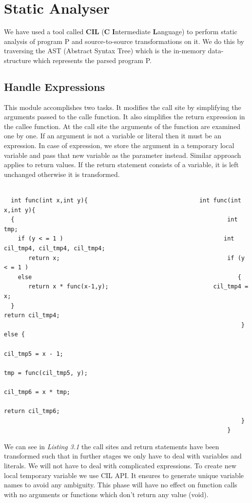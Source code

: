\documentclass[12pt,oneside]{book}
\begin{document}
\section{Static Analyser}
We have used a tool called \textbf{CIL}\cite{cilapi} (\textbf{C} \textbf{I}ntermediate \textbf{L}anguage) to perform static analysis of program P and source-to-source transformations on it. We do this by traversing the AST (Abstract Syntax Tree) which is the in-memory data-structure which represents the parsed program P.

\subsection{Handle Expressions}

This module accomplishes two tasks. It modifies the call site by simplifying the arguments passed to the calle function. It also simplifies the return expression in the callee function. At the call site the arguments of the function are examined one by one. If an argument is not a variable or literal then it must be an expression. In case of expression, we store the argument in a temporary local variable and pass that new variable as the parameter instead. Similar approach applies to return values. If the return statement consists of a variable, it is left unchanged otherwise it is transformed.\\

\begin{lstlisting}[caption=Expressions simplified]

  int func(int x,int y){								int func(int x,int y){
  {																int tmp;
    if (y < = 1 )											   int cil_tmp4, cil_tmp4, cil_tmp4;
       return x;												if (y < = 1 )
    else														   {
       return x * func(x-1,y);							    cil_tmp4 = x;
  }																    return cil_tmp4;
     															    } else {
																       cil_tmp5 = x - 1;
																       tmp = func(cil_tmp5, y);
																       cil_tmp6 = x * tmp;
																       return cil_tmp6;
																    }
															    }

\end{lstlisting}


We can see in \textit{Listing 3.1} the call sites and return statements have been transformed such that in further stages we only have to deal with variables and literals. We will not have to deal with complicated expressions. To create new local temporary variable we use CIL API. It ensures to generate unique variable names to avoid any ambiguity.
This phase will have no effect on function calls with no arguments or functions which don't return any value (void).
\newpage
\end{document}
